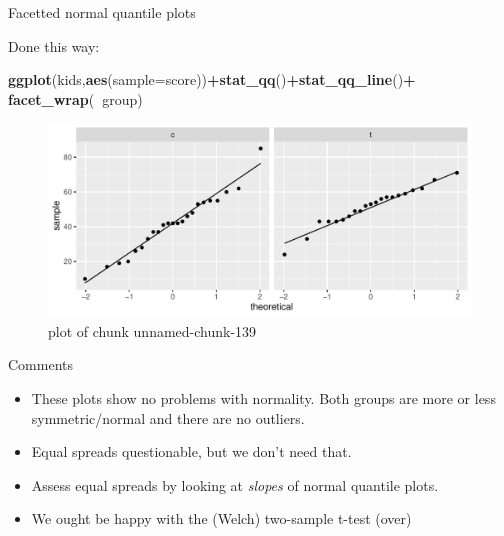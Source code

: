 \documentclass[
  ignorenonframetext,
]{beamer}
\newenvironment{Shaded}{\begin{snugshade}}{\end{snugshade}}
\newcommand{\DataTypeTok}[1]{\textcolor[rgb]{0.13,0.29,0.53}{#1}}
\newcommand{\KeywordTok}[1]{\textcolor[rgb]{0.13,0.29,0.53}{\textbf{#1}}}
\newcommand{\NormalTok}[1]{#1}
\newcommand{\OperatorTok}[1]{\textcolor[rgb]{0.81,0.36,0.00}{\textbf{#1}}}
\providecommand{\tightlist}{%
  \setlength{\itemsep}{0pt}\setlength{\parskip}{0pt}}
\begin{document}
\begin{frame}[fragile]{Facetted normal quantile plots}
\protect\hypertarget{facetted-normal-quantile-plots}{}

Done this way:

\begin{Shaded}
\begin{Highlighting}[]
\KeywordTok{ggplot}\NormalTok{(kids,}\KeywordTok{aes}\NormalTok{(}\DataTypeTok{sample=}\NormalTok{score))}\OperatorTok{+}\KeywordTok{stat_qq}\NormalTok{()}\OperatorTok{+}\KeywordTok{stat_qq_line}\NormalTok{()}\OperatorTok{+}
\KeywordTok{facet_wrap}\NormalTok{(}\OperatorTok{~}\NormalTok{group)}
\end{Highlighting}
\end{Shaded}

\begin{figure}
\centering
\includegraphics{figure/unnamed-chunk-139-1.pdf}
\caption{plot of chunk unnamed-chunk-139}
\end{figure}

\end{frame}

\begin{frame}{Comments}
\protect\hypertarget{comments-8}{}

\begin{itemize}
\tightlist
\item
  These plots show no problems with normality. Both groups are more or
  less symmetric/normal and there are no outliers.
\item
  Equal spreads questionable, but we don't need that.
\item
  Assess equal spreads by looking at \emph{slopes} of normal quantile
  plots.
\item
  We ought be happy with the (Welch) two-sample t-test (over)
\end{itemize}

\end{frame}
\end{document}
